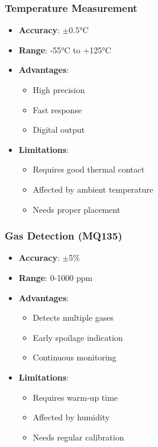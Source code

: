 \documentclass[12pt,a4paper]{article}
\begin{document}
\subsubsection{Temperature Measurement}
\begin{itemize}
    \item \textbf{Accuracy}: $\pm$0.5°C
    \item \textbf{Range}: -55°C to +125°C
    \item \textbf{Advantages}:
    \begin{itemize}
        \item High precision
        \item Fast response
        \item Digital output
    \end{itemize}
    \item \textbf{Limitations}:
    \begin{itemize}
        \item Requires good thermal contact
        \item Affected by ambient temperature
        \item Needs proper placement
    \end{itemize}
\end{itemize}

\subsubsection{Gas Detection (MQ135)}
\begin{itemize}
    \item \textbf{Accuracy}: $\pm$5\%
    \item \textbf{Range}: 0-1000 ppm
    \item \textbf{Advantages}:
    \begin{itemize}
        \item Detects multiple gases
        \item Early spoilage indication
        \item Continuous monitoring
    \end{itemize}
    \item \textbf{Limitations}:
    \begin{itemize}
        \item Requires warm-up time
        \item Affected by humidity
        \item Needs regular calibration
    \end{itemize}
\end{itemize}
\end{document}
